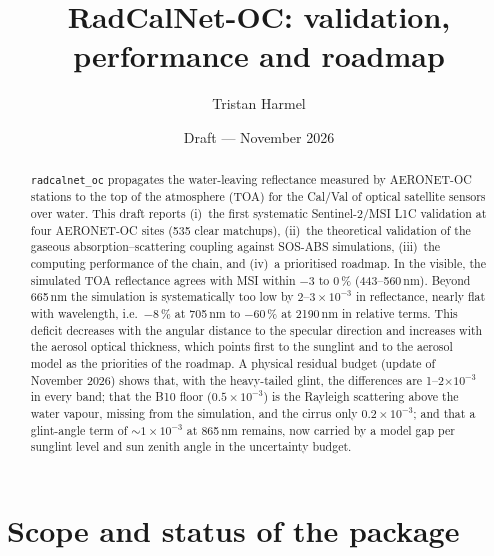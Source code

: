 \documentclass[11pt,a4paper]{article}
\title{RadCalNet-OC: validation, performance and roadmap}
\author{Tristan Harmel}
\date{Draft --- November 2026}
\newcommand{\code}[1]{\texttt{#1}}
\begin{document}
\maketitle

\begin{abstract}
\code{radcalnet\_oc} propagates the water-leaving reflectance measured by AERONET-OC stations to the top of
the atmosphere (TOA) for the Cal/Val of optical satellite sensors over water. This draft reports
(i)~the first systematic Sentinel-2/MSI L1C validation at four AERONET-OC sites (535 clear matchups),
(ii)~the theoretical validation of the gaseous absorption--scattering coupling against SOS-ABS simulations,
(iii)~the computing performance of the chain, and (iv)~a prioritised roadmap. In the visible, the simulated
TOA reflectance agrees with MSI within $-3$ to $0\,\%$ (443--560\,nm). Beyond 665\,nm the simulation is
systematically too low by $2$--$3\times10^{-3}$ in reflectance, nearly flat with wavelength, i.e.\ $-8\,\%$
at 705\,nm to $-60\,\%$ at 2190\,nm in relative terms. This deficit decreases with the angular distance to
the specular direction and increases with the aerosol optical thickness, which points first to the sunglint
and to the aerosol model as the priorities of the roadmap. A physical residual budget (update of November 2026)
shows that, with the heavy-tailed glint, the differences are 1--2$\times10^{-3}$ in every band; that the B10 floor
($0.5\times10^{-3}$) is the Rayleigh scattering above the water vapour, missing from the simulation, and the cirrus
only $0.2\times10^{-3}$; and that a glint-angle term of $\sim1\times10^{-3}$ at 865\,nm remains, now carried by a model
gap per sunglint level and sun zenith angle in the uncertainty budget.
\end{abstract}

\tableofcontents

\section{Scope and status of the package}
\end{document}
